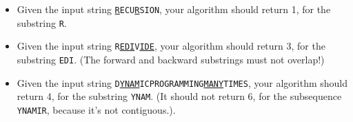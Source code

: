 \begin{questions}
\begin{itemize}
  \item Given the input string
    \texttt{\underline{R}ECU\underline{R}SION}, your algorithm should
    return 1, for the substring \texttt{R}.
  \item Given the input string
    \texttt{R\underline{EDI}V\underline{IDE}}, your algorithm should
    return 3, for the substring \texttt{EDI}. (The forward and backward
    substrings must not overlap!)
  \item Given the input string
    \texttt{D\underline{YNAM}ICPROGRAMMING\underline{MANY}TIMES}, your
    algorithm should return 4, for the substring \texttt{YNAM}. (It
    should not return 6, for the subsequence \texttt{YNAMIR}, because
    it's not contiguous.).
  \end{itemize}

\end{questions}



